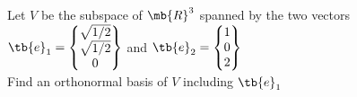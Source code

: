 \bexo
Let $V$ be the subspace of $\mb{R}^3$ spanned by the two vectors $\tb{e}_1=\begin{Bmatrix}
	\sqrt{1/2}\\\sqrt{1/2} \\ 0
\end{Bmatrix}$ and $\tb{e}_2=\begin{Bmatrix}
	1\\0 \\ 2
\end{Bmatrix}$\\
Find an orthonormal basis of $V$ including $\tb{e}_1$  
\eexo
\solution{
 

}
